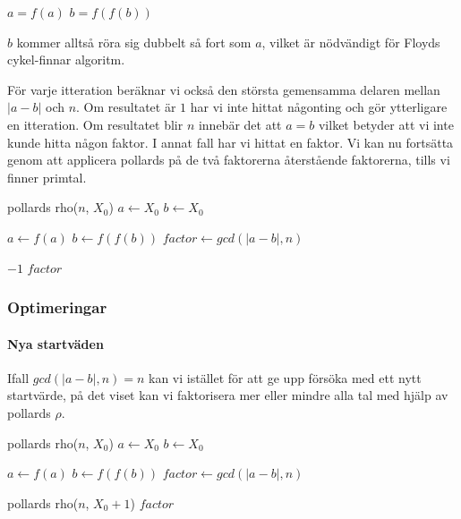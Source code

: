 \documentclass[a4paper,12pt]{article}
\renewcommand{\*}{\ensuremath{\cdot}}
\begin{document}
$a = f(a)$
$b = f(f(b))$

$b$ kommer alltså röra sig dubbelt så fort som $a$, vilket är nödvändigt för Floyds cykel-finnar algoritm.

För varje itteration beräknar vi också den största gemensamma delaren mellan $|a-b|$ och $n$. Om resultatet är $1$ har vi inte hittat någonting och gör ytterligare en itteration. Om resultatet blir $n$ innebär det att $a=b$ vilket betyder att vi inte kunde hitta någon faktor. I annat fall har vi hittat en faktor. Vi kan nu fortsätta genom att applicera pollards på de två faktorerna återstående faktorerna, tills vi finner primtal.

\begin{algorithmic}
    \STATE pollards rho($n$, $X_0$)
        \STATE $a \gets X_0 $
        \STATE $b \gets X_0 $

            \STATE $a \gets f(a)$
            \STATE $b \gets f(f(b))$
            \STATE $factor \gets gcd(|a-b|, n)$
        \ENDWHILE

            \STATE {}
            \RETURN $-1$ 
            \RETURN $factor$
        \ENDIF
\end{algorithmic}


\subsubsection{Optimeringar}
\paragraph{Nya startväden}

Ifall $gcd(|a-b|, n) = n$ kan vi istället för att ge upp försöka med ett nytt startvärde, på det viset kan vi faktorisera mer eller mindre alla tal med hjälp av pollards $\rho$.

\begin{algorithmic}
    \STATE pollards rho($n$, $X_0$)
        \STATE $a \gets X_0 $
        \STATE $b \gets X_0 $

            \STATE $a \gets f(a)$
            \STATE $b \gets f(f(b))$
            \STATE $factor \gets gcd(|a-b|, n)$
        \ENDWHILE

            \STATE {}
            \RETURN pollards rho($n$, $X_0+1$) 
            \RETURN $factor$
        \ENDIF
\end{algorithmic}
\end{document}
